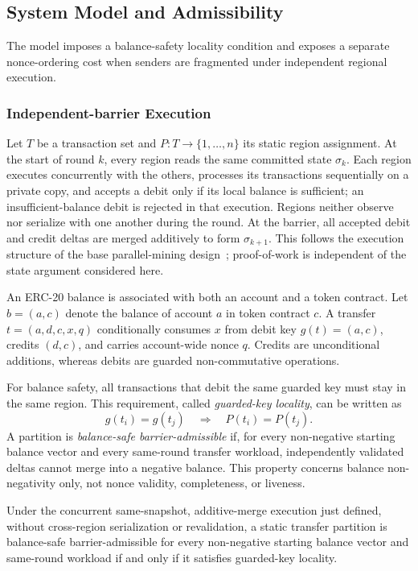 \documentclass[runningheads]{llncs}
\begin{document}
\subsection{System Model and Admissibility}
\label{sec:model}

The model imposes a balance-safety locality condition and exposes a separate nonce-ordering cost when senders are fragmented under independent regional execution.

\subsubsection{Independent-barrier Execution}

Let $T$ be a transaction set and
$P:T\rightarrow\{1,\ldots,n\}$ its static region assignment. At the start of
round $k$, every region reads the same committed state $\sigma_k$. Each region
executes concurrently with the others, processes its transactions sequentially
on a private copy, and accepts a debit only if its local balance is sufficient;
an insufficient-balance debit is rejected in that execution. Regions neither
observe nor serialize with one another during the round. At the barrier, all
accepted debit and credit deltas are merged additively to form $\sigma_{k+1}$.
This follows the execution structure of the base
parallel-mining design~\cite{chishti2021}; proof-of-work is independent of the
state argument considered here.

An ERC-20 balance is associated with both an account and a token contract. Let
$b=(a,c)$ denote the balance of account $a$ in token contract $c$. A transfer
$t=(a,d,c,x,q)$ conditionally consumes $x$ from debit key
$g(t)=(a,c)$, credits $(d,c)$, and carries account-wide nonce $q$. Credits are
unconditional additions, whereas debits are guarded non-commutative
operations.

For balance safety, all transactions that debit the same guarded key must stay
in the same region. This requirement, called \emph{guarded-key locality}, can
be written as
\[
g(t_i)=g(t_j)\quad\Longrightarrow\quad P(t_i)=P(t_j).
\]
A partition is \emph{balance-safe barrier-admissible} if, for every non-negative
starting balance vector and every same-round transfer workload, independently
validated deltas cannot merge into a negative balance. This property concerns
balance non-negativity only, not nonce validity, completeness, or liveness.

\begin{theorem}
\label{thm:barrier_admissibility}
Under the concurrent same-snapshot, additive-merge execution just defined,
without cross-region serialization or revalidation, a static transfer
partition is balance-safe barrier-admissible for every non-negative starting
balance vector and same-round workload if and only if it satisfies guarded-key
locality.
\end{theorem}
\end{document}
